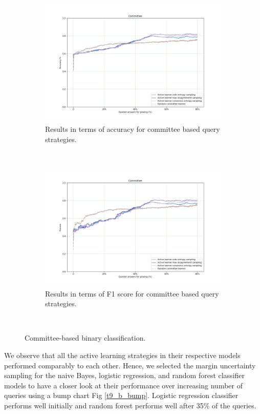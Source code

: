 \begin{figure}[!htb]
	\begin{subfigure}[b]{0.5\textwidth}
		\includegraphics[width=\textwidth]{images/binary/task9_accuracy_com}
		\caption{Results in terms of accuracy for committee based query strategies.}
		\label{t9_b_com}
	\end{subfigure}
	~
	\begin{subfigure}[b]{0.5\textwidth}
		\includegraphics[width=\textwidth]{images/binary/task9_f1score_com}
		\caption{Results in terms of F1 score for committee based query strategies.}
		\label{t9_b_com_f1}
	\end{subfigure}
	~
	\caption{Committee-based binary classification.}
\end{figure}

We observe that all the active learning strategies in their respective models performed comparably to each other. Hence, we selected the margin uncertainty sampling for the naive Bayes, logistic regression, and random forest classifier models to have a closer look at their performance over increasing number of queries using a bump chart Fig \ref{t9_b_bump}. Logistic regression classifier performs well initially and random forest performs well after 35\% of the queries.  

